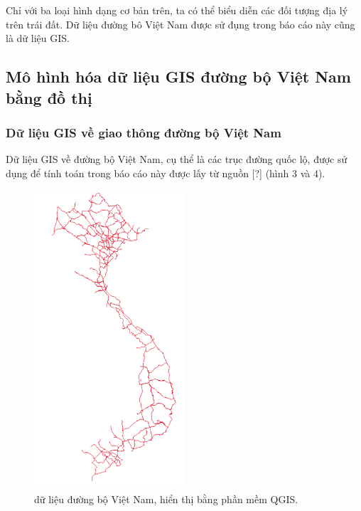 \documentclass[14pt, oneside, a4paper, openany]{scrartcl}
\begin{document}
Chỉ với ba loại hình dạng cơ bản trên, ta có thể biểu diễn các đối tượng địa lý trên trái đất. Dữ liệu đường bô Việt Nam được sử đụng trong báo cáo này cũng là dữ liệu GIS.
\subsection{Mô hình hóa dữ liệu GIS đường bộ Việt Nam bằng đồ thị}
\subsubsection{Dữ liệu GIS về giao thông đường bộ Việt Nam}
Dữ liệu GIS về đường bộ Việt Nam, cụ thể là các trục đường quốc lộ, được sử dụng để tính toán trong báo cáo này được lấy từ nguồn [?] (hình 3 và 4).
\begin{figure}
	\centering
	\begin{minipage}{0.6\textwidth}
		\centering
		\includegraphics[width=0.5\textwidth]{figures/vietnamroad.png} %
		\caption[dữ liệu đường bộ Việt Nam]{dữ liệu đường bộ Việt Nam, hiển thị bằng phần mềm QGIS.}
	\end{minipage}\hfill
	\begin{minipage}{0.6\textwidth}
		\centering

\end{minipage}
\end{figure}
\end{document}
